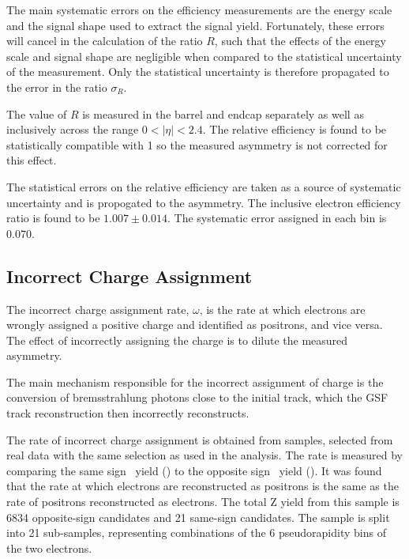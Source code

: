 The main systematic errors on the efficiency measurements are the energy scale
and the signal shape used to extract the signal yield. Fortunately, these
errors will cancel in the calculation of the ratio $R$, such that the
effects of the energy scale and signal shape are negligible
when compared to the statistical uncertainty of the measurement. Only the
statistical uncertainty is therefore propagated to the error in the ratio
$\sigma_R$.


The value of $R$ is measured in the barrel and endcap separately as well as inclusively
across the range $0<| \eta |< 2.4$. 
The relative efficiency is found to be statistically compatible with 1 so the
measured asymmetry is not corrected for this effect.

The statistical errors on the relative efficiency are taken as a source of
systematic uncertainty and is propogated to the asymmetry. The inclusive
electron efficiency ratio is found to be $1.007\pm0.014$.  The systematic error
assigned in each bin is $0.070$. 

\subsection{Incorrect Charge Assignment}

The incorrect charge assignment rate, $\omega$, is the rate at which electrons are
wrongly assigned a positive charge and identified as positrons, and vice versa.
The effect of incorrectly assigning the charge is to dilute the measured
asymmetry.

The main mechanism responsible for the incorrect assignment of charge is the
conversion of bremsstrahlung photons close to the initial track, which the GSF
track reconstruction then incorrectly reconstructs.

The rate of incorrect charge assignment is obtained from \Zee samples, selected from
real data with the same selection as used in the analysis. 
The rate is measured by comparing the
same sign \PZ\ yield (\HepProcess{\PZ\to\Pepm\Pepm}) to the opposite sign \PZ\
yield (\HepProcess{\PZ\to\Pelectron\APelectron}).
It was found that the rate at which electrons are reconstructed as positrons is
the same as the rate of positrons reconstructed as electrons.
The total Z yield from this sample is 6834 opposite-sign \PZ candidates and 21
same-sign \PZ candidates.
The sample is split into 21 sub-samples, representing
combinations of the 6 pseudorapidity bins of the two electrons.

